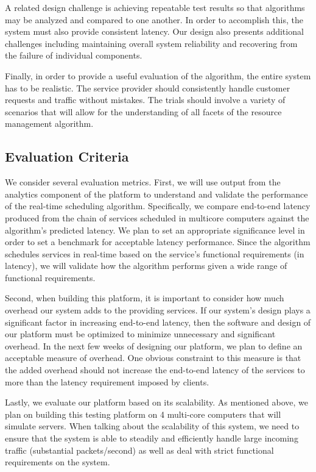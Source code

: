 \documentclass{sig-alternate}
\begin{document}
A related design challenge is achieving repeatable test results so that algorithms may be analyzed and compared to one another. In order to accomplish this, the system must also provide consistent latency. Our design also presents additional challenges including maintaining overall system reliability and recovering from the failure of individual components.

Finally, in order to provide a useful evaluation of the algorithm, the entire system has to be realistic. The service provider should consistently handle customer requests and traffic without mistakes. The trials should involve a variety of scenarios that will allow for the understanding of all facets of the resource management algorithm.

\subsection{Evaluation Criteria}
\label{subsec:eval_criteria}

We consider several evaluation metrics. First, we will use output from the analytics component of the platform to understand and validate the performance of the real-time scheduling algorithm. Specifically, we compare end-to-end latency produced from the chain of services scheduled in multicore computers against the algorithm's predicted latency. We plan to set an appropriate significance level in order to set a benchmark for acceptable latency performance. Since the algorithm schedules services in real-time based on the service's functional requirements (in latency), we will validate how the algorithm performs given a wide range of functional requirements.

Second, when building this platform, it is important to consider how much overhead our system adds to the providing services. If our system's design plays a significant factor in increasing end-to-end latency, then the software and design of our platform must be optimized to minimize unnecessary and significant overhead. In the next few weeks of designing our platform, we plan to define an acceptable measure of overhead. One obvious constraint to this measure is that the added overhead should not increase the end-to-end latency of the services to more than the latency requirement imposed by clients.

Lastly, we evaluate our platform based on its scalability. As mentioned above, we plan on building this testing platform on 4 multi-core computers that will simulate servers. When talking about the scalability of this system, we need to ensure that the system is able to steadily and efficiently handle large incoming traffic (substantial packets/second) as well as deal with strict functional requirements on the system.
\end{document}
